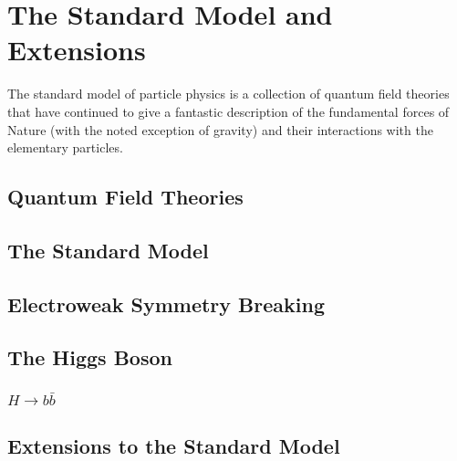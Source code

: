 \chapter{The Standard Model and Extensions}\label{chapter:theory}

The standard model of particle physics is a collection of quantum field theories that have continued to give a fantastic description of the fundamental forces of Nature (with the noted exception of gravity) and their interactions with the elementary particles.

\section{Quantum Field Theories}\label{section:QFT}

\section{The Standard Model}\label{section:standard_model}

\section{Electroweak Symmetry Breaking}\label{section:EWSB}

\section{The Higgs Boson}\label{section:Higgs_boson}

\subsection{$H\to b\bar{b}$}\label{section:Hbb}

\section{Extensions to the Standard Model}
